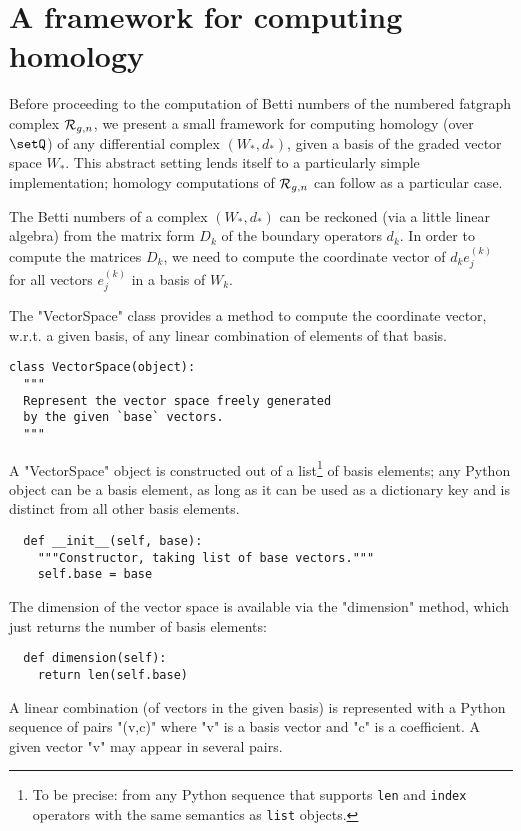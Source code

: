 \section{A framework for computing homology}
\label{sec:homology}

Before proceeding to the computation of Betti numbers of the numbered
fatgraph complex $\mathcal{R}_{g,n}$, we present a small framework for computing
homology (over $\setQ$) of any differential complex $(W_*, d_*)$, given a
basis of the graded vector space $W_*$.  This abstract setting lends
itself to a particularly simple implementation; homology computations
of $\mathcal{R}_{g,n}$ can follow as a particular case.

The Betti numbers of a complex $(W_*, d_*)$ can be reckoned (via a
little linear algebra) from the matrix form $D_k$ of the boundary
operators $d_k$.  In order to compute the matrices $D_k$, we need to
compute the coordinate vector of $d_ke^{(k)}_j$ for all vectors
$e^{(k)}_j$ in a basis of $W_k$.

The "VectorSpace" class provides a method to compute the coordinate
vector, w.r.t. a given basis, of any linear combination of elements of
that basis.
\begin{lstlisting}
class VectorSpace(object):
  """
  Represent the vector space freely generated 
  by the given `base` vectors.
  """
\end{lstlisting}
A "VectorSpace" object is constructed out of a list\footnote{To be
  precise: from any Python sequence that supports \Verb'len' and
  \Verb'index' operators with the same semantics as \Verb'list'
  objects.} of basis elements; any Python object can be a basis
element, as long as it can be used as a dictionary key and is distinct
from all other basis elements.
\begin{lstlisting}
  def __init__(self, base):
    """Constructor, taking list of base vectors."""
    self.base = base

\end{lstlisting}
The dimension of the vector space is available via the "dimension"
method, which just returns the number of basis elements:
\begin{lstlisting}
  def dimension(self):
    return len(self.base)

\end{lstlisting}

A linear combination (of vectors in the given basis) is represented
with a Python sequence of pairs "(v,c)" where "v" is a basis vector
and "c" is a coefficient.  A given vector "v" may appear in several
pairs. 

